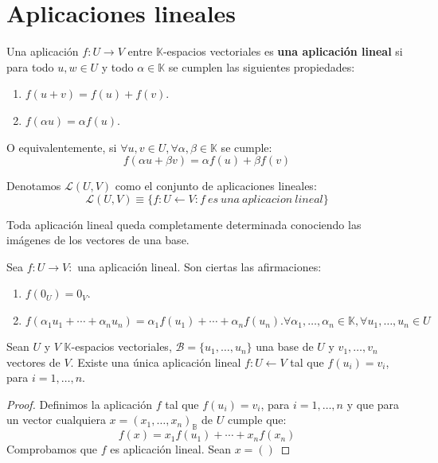 \chapter{Aplicaciones lineales}

\begin{defi}
	Una aplicación $f: U \longrightarrow V$ entre $\mathbb{K}$-espacios vectoriales es \textbf{una aplicación lineal} si para todo $u,w \in U$ y todo $\alpha \in \mathbb{K}$ se cumplen las siguientes propiedades:
	\begin{enumerate}
		\item $f(u+v) = f(u) + f(v)$.
		\item $f(\alpha u) = \alpha f(u)$.
	\end{enumerate}
	O equivalentemente, si $\forall u,v \in U,\forall \alpha,\beta \in \mathbb{K}$ se cumple:
	\[
	f(\alpha u + \beta v) = \alpha f(u) + \beta f(v)
	\]
\end{defi}

Denotamos $\mathcal{L}(U,V)$ como el conjunto de aplicaciones lineales:
\[
\mathcal{L}(U,V) \equiv \lbrace f: U \longleftarrow V: f \ es \ una \ aplicacion \ lineal \rbrace
\]

Toda aplicación lineal queda completamente determinada conociendo las imágenes de los vectores de una base.

\begin{prop}
	Sea $f: U \longrightarrow V:$ una aplicación lineal. Son ciertas las afirmaciones:
	\begin{enumerate}
		\item $f(0_U)=0_V$.
		\item $f(\alpha_1 u_1 + \cdots + \alpha_n u_n) = \alpha_1 f(u_1) + \cdots + \alpha_n f(u_n). \forall \alpha_1,\ldots,\alpha_n \in \mathbb{K},\forall u_1,\ldots,u_n \in U$
	\end{enumerate}
\end{prop}

\begin{prop}
	Sean $U$ y $V$ $\mathbb{K}$-espacios vectoriales, $\mathcal{B}=\lbrace u_1,\ldots, u_n \rbrace$ una base de $U$ y $v_1,\ldots,v_n$ vectores de $V$. Existe una única aplicación lineal $f: U \longleftarrow V$ tal que $f(u_i)=v_i$, para $i=1,\ldots,n$.
\end{prop}

\begin{proof}
	Definimos la aplicación $f$ tal que $f(u_i)=v_i$, para $i=1,\ldots,n$ y que para un vector cualquiera $x=(x_1,\ldots,x_n)_\mathbb{B}$ de $U$ cumple que:
	\[
	f(x)=x_1 f(u_1) + \cdots + x_n f(x_n)
	\] 
	Comprobamos que $f$ es aplicación lineal. Sean $x=()$
\end{proof}